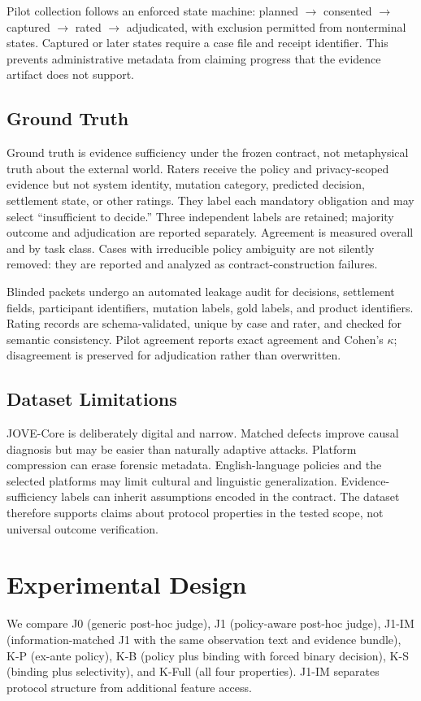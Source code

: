 \documentclass[sigconf,anonymous,review]{acmart}
\begin{document}
Pilot collection follows an enforced state machine: planned $\rightarrow$ consented $\rightarrow$ captured $\rightarrow$ rated $\rightarrow$ adjudicated, with exclusion permitted from nonterminal states. Captured or later states require a case file and receipt identifier. This prevents administrative metadata from claiming progress that the evidence artifact does not support.

\subsection{Ground Truth}
Ground truth is evidence sufficiency under the frozen contract, not metaphysical truth about the external world. Raters receive the policy and privacy-scoped evidence but not system identity, mutation category, predicted decision, settlement state, or other ratings. They label each mandatory obligation and may select ``insufficient to decide.'' Three independent labels are retained; majority outcome and adjudication are reported separately. Agreement is measured overall and by task class. Cases with irreducible policy ambiguity are not silently removed: they are reported and analyzed as contract-construction failures.

Blinded packets undergo an automated leakage audit for decisions, settlement fields, participant identifiers, mutation labels, gold labels, and product identifiers. Rating records are schema-validated, unique by case and rater, and checked for semantic consistency. Pilot agreement reports exact agreement and Cohen's $\kappa$; disagreement is preserved for adjudication rather than overwritten.

\subsection{Dataset Limitations}
JOVE-Core is deliberately digital and narrow. Matched defects improve causal diagnosis but may be easier than naturally adaptive attacks. Platform compression can erase forensic metadata. English-language policies and the selected platforms may limit cultural and linguistic generalization. Evidence-sufficiency labels can inherit assumptions encoded in the contract. The dataset therefore supports claims about protocol properties in the tested scope, not universal outcome verification.

\section{Experimental Design}
We compare J0 (generic post-hoc judge), J1 (policy-aware post-hoc judge), J1-IM (information-matched J1 with the same observation text and evidence bundle), K-P (ex-ante policy), K-B (policy plus binding with forced binary decision), K-S (binding plus selectivity), and K-Full (all four properties). J1-IM separates protocol structure from additional feature access.
\end{document}
